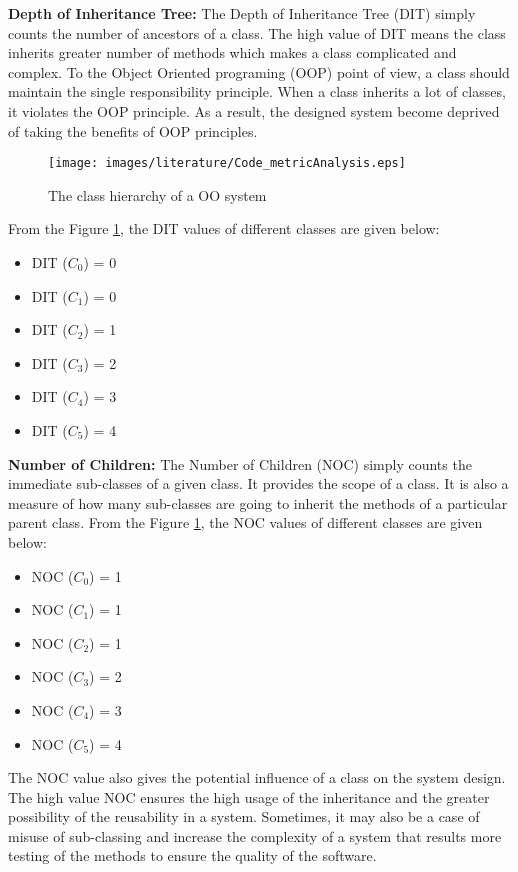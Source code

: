 \documentclass[12pt]{report}
\begin{document}
\textbf{Depth of Inheritance Tree:}
The Depth of Inheritance Tree (DIT) simply counts the number of ancestors of a class. The high value of DIT means the class inherits greater number of methods which makes a class complicated and complex. To the Object Oriented programing (OOP) point of view, a class should maintain the single responsibility principle. When a class inherits a lot of classes, it violates the OOP principle. As a result, the designed system become deprived of taking the benefits of OOP principles. 

\begin{figure}[h!]
  \centering
    \texttt{[image: images/literature/Code\_metricAnalysis.eps]}
		\caption{The class hierarchy of a OO system}
		\label{dit_codeMetrics}
\end{figure}
From the Figure \ref{dit_codeMetrics}, the DIT values of different classes are given below:
\begin{itemize}
\item DIT ($C_{0}$) = 0
\item DIT ($C_{1}$) = 0
\item DIT ($C_{2}$) = 1
\item DIT ($C_{3}$) = 2
\item DIT ($C_{4}$) = 3
\item DIT ($C_{5}$) = 4
\end{itemize}

\textbf{Number of Children:}
The Number of Children (NOC) simply counts the immediate sub-classes of a given class. It provides the scope of a class. It is also a measure of how many sub-classes are going to inherit the methods of a particular parent class. From the Figure \ref{dit_codeMetrics}, the NOC values of different classes are given below:

\begin{itemize}
\item NOC ($C_{0}$) = 1
\item NOC ($C_{1}$) = 1
\item NOC ($C_{2}$) = 1
\item NOC ($C_{3}$) = 2
\item NOC ($C_{4}$) = 3
\item NOC ($C_{5}$) = 4
\end{itemize}

The NOC value also gives the potential influence of a class on the system design. The high value NOC ensures the high usage of the inheritance and the greater possibility of the reusability in a system. Sometimes, it may also be a case of misuse of sub-classing and increase the complexity of a system that results more testing of the methods to ensure the quality of the software.
\end{document}
